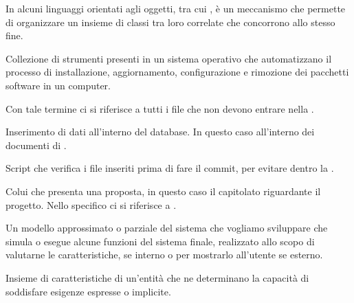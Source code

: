 \begin{itemize}


In alcuni linguaggi orientati agli oggetti, tra cui , è un meccanismo che permette di organizzare un insieme di classi tra loro correlate che concorrono allo stesso fine.


Collezione di strumenti presenti in un sistema operativo che automatizzano il processo di installazione, aggiornamento, configurazione e rimozione dei pacchetti software in un computer.


Con tale termine ci si riferisce a tutti i file che non devono entrare nella .


Inserimento di dati all'interno del database. In questo caso all'interno dei documenti di .


Script che verifica i file inseriti prima di fare il commit, per evitare  dentro la .


Colui che presenta una proposta, in questo caso il capitolato riguardante il progetto.
Nello specifico ci si riferisce a \Proponente{}.


Un modello approssimato o parziale del sistema che vogliamo sviluppare che simula o esegue alcune funzioni del sistema finale, realizzato allo scopo di valutarne le caratteristiche, se interno o per mostrarlo all'utente se esterno.

\end{itemize}


\begin{itemize}


Insieme di caratteristiche di un'entità che ne determinano la capacità di soddisfare esigenze espresse o implicite.

\end{itemize}


